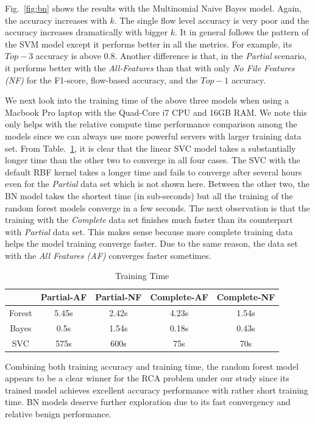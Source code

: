 Fig.~\ref{fig:bn} shows the results with the Multinomial Naive Bayes model. Again, the accuracy increases with $k$. The single flow level accuracy is very poor and the accuracy increases dramatically with bigger $k$. 
It in general follows the pattern of the SVM model except it performs better in all the metrics. For example, its $Top-3$ accuracy is above $0.8$. Another difference is that, in the {\it Partial} scenario, it performs better with the {\it All-Features} than that with only {\it No File Features (NF) } for the F1-score, flow-based accuracy, and the $Top-1$ accuracy.

We next look into the training time of the above three models when using a Macbook Pro laptop with the Quad-Core i7 CPU and 16GB RAM. We note this only helps with the relative compute time performance comparison among the models since we can always use more powerful servers with larger training data set. From Table.~\ref{tab:time}, it is clear that the linear SVC model takes a substantially longer time than the other two to converge in all four cases. The SVC with the default RBF kernel takes a longer time and fails to converge after several hours even for the {\it Partial} data set which is not shown here. Between the other two, the BN model takes the shortest time (in sub-seconds) but all the training of the random forest models converge in a few seconds. The next observation is that the training with the {\it Complete} data set finishes much faster than its counterpart with {\it Partial} data set. This makes sense because more complete training data helps the model training converge faster. Due to the same reason, the data set with the {\it All Features (AF)} converges faster sometimes.

\begin{table}[!ht]
\caption{Training Time }
\label{tab:time}
\begin{center}
\begin{tabular}{ |c|c|c|c|c| } 
 \hline
  & Partial-AF & Partial-NF & Complete-AF & Complete-NF\\ 
 \hline
 Forest & 5.45s & 2.42s & 4.23s & 1.54s\\ 
 \hline
 Bayes & 0.5s & 1.54s & 0.18s & 0.43s\\
 \hline
 SVC & 575s & 600s & 75s &70s\\ 
 \hline
\end{tabular}
\end{center}
\end{table}
Combining both training accuracy and training time, the random forest model appears to be a clear winner for the RCA problem under our study since its trained model achieves excellent accuracy performance with rather short training time. BN models deserve further exploration due to its fast convergency and relative benign performance.

